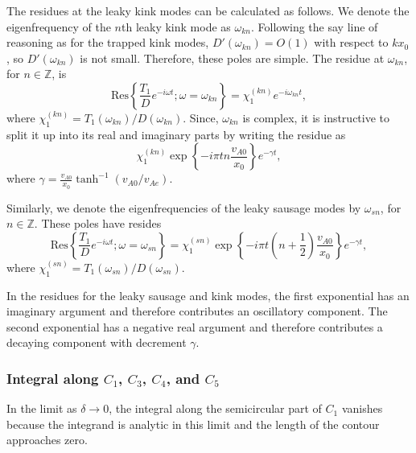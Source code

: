 \documentclass[12pt]{../style-files/ociamthesis}
\begin{document}
The residues at the leaky kink modes can be calculated as follows. We denote the eigenfrequency of the $n$th leaky kink mode as $\omega_{kn}$. Following the say line of reasoning as for the trapped kink modes, $D'(\omega_{kn}) = O(1)$ with respect to $kx_0$, so $D'(\omega_{kn})$ is not small. Therefore, these poles are simple. The residue at $\omega_{kn}$, for $n \in \mathbb{Z}$, is
\begin{equation}
\text{Res}\left\{ \frac{T_1}{D} e^{-i\omega t} ; \omega = \omega_{kn} \right\} = \chi_1^{(kn)} e^{-i\omega_{kn} t},
\end{equation}
where $\chi_1^{(kn)} = T_1(\omega_{kn})/D(\omega_{kn})$. Since, $\omega_{kn}$ is complex, it is instructive to split it up into its real and imaginary parts by writing the residue as
\begin{equation}
\chi_1^{(kn)} \exp\left\{-i \pi tn\frac{v_{A0}}{x_0}\right\} e^{-\gamma t},
\end{equation}
where $\gamma = \frac{v_{A0}}{x_0}\tanh^{-1}(v_{A0}/v_{Ae})$.

Similarly, we denote the eigenfrequencies of the leaky sausage modes by $\omega_{sn}$, for $n \in \mathbb{Z}$. These poles have resides
\begin{equation}
\text{Res}\left\{ \frac{T_1}{D} e^{-i\omega t} ; \omega = \omega_{sn} \right\} = \chi_1^{(sn)} \exp\left\{-i \pi t\left(n + \frac{1}{2}\right)\frac{v_{A0}}{x_0}\right\} e^{-\gamma t},
\end{equation}
where $\chi_1^{(sn)} = T_1(\omega_{sn})/D(\omega_{sn})$.

In the residues for the leaky sausage and kink modes, the first exponential has an imaginary argument and therefore contributes an oscillatory component. The second exponential has a negative real argument and therefore contributes a decaying component with decrement $\gamma$.


\subsubsection{Integral along $C_1$, $C_3$, $C_4$, and $C_5$}
In the limit as $\delta \to 0$, the integral along the semicircular part of $C_1$ vanishes because the integrand is analytic in this limit and the length of the contour approaches zero.
\end{document}
